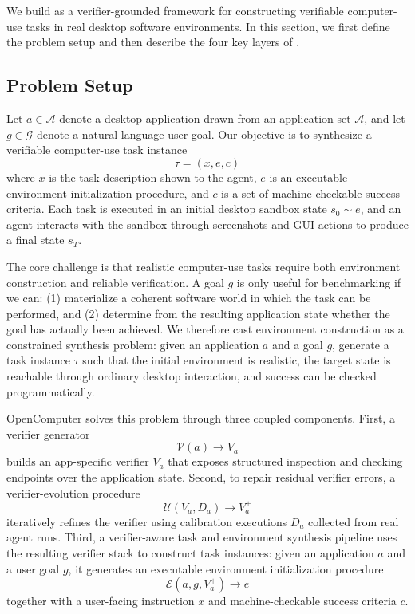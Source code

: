 \section{\ours}
\label{sec:methodology}
We build \ours as a verifier-grounded framework for constructing
verifiable computer-use tasks in real desktop software environments. In this section, we first define the problem setup and then describe the four key layers of \ours.

\subsection{Problem Setup}

Let $a \in \mathcal{A}$ denote a desktop application drawn from an application
set $\mathcal{A}$, and let $g \in \mathcal{G}$ denote a natural-language user
goal. Our objective is to synthesize a verifiable computer-use task instance
\[
\tau = (x, e, c)
\]
where $x$ is the task description shown to the agent, $e$ is an executable
environment initialization procedure, and $c$ is a set of machine-checkable
success criteria. Each task is executed in an initial desktop sandbox state
$s_0 \sim e$, and an agent interacts with the sandbox through screenshots and
GUI actions to produce a final state $s_T$.

The core challenge is that realistic computer-use tasks require both
environment construction and reliable verification. A goal $g$ is only useful
for benchmarking if we can: (1) materialize a coherent software world in which
the task can be performed, and (2) determine from the resulting application
state whether the goal has actually been achieved. We therefore cast environment construction as a constrained synthesis problem: given an application $a$ and a
goal $g$, generate a task instance $\tau$ such that the initial environment is
realistic, the target state is reachable through ordinary desktop interaction,
and success can be checked programmatically.

OpenComputer solves this problem through three coupled components. First, a
verifier generator
\[
\mathcal{V}(a) \rightarrow V_a
\]
builds an app-specific verifier $V_a$ that exposes structured inspection and
checking endpoints over the application state. Second, to repair residual verifier errors, a verifier-evolution procedure
\[
\mathcal{U}(V_a, D_a) \rightarrow V_a^+
\]
iteratively refines the verifier using calibration executions $D_a$ collected
from real agent runs. Third, a verifier-aware task and environment synthesis
pipeline uses the resulting verifier stack to construct task instances: given
an application $a$ and a user goal $g$, it generates an executable environment
initialization procedure
\[
\mathcal{E}(a,g,V_a^+) \rightarrow e
\]
together with a user-facing instruction $x$ and machine-checkable success
criteria $c$.

